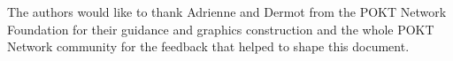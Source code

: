 \documentclass[conference,compsoc]{IEEEtran}
\begin{document}
The authors would like to thank Adrienne and Dermot from the POKT Network Foundation for their guidance and graphics construction and the whole POKT Network community for the feedback that helped to shape this document.









%






\end{document}
